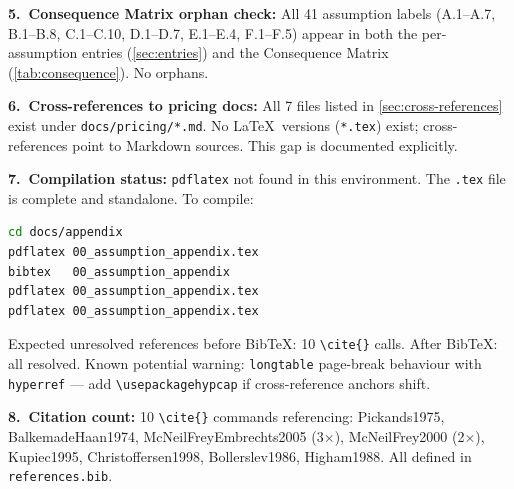 \documentclass[11pt,a4paper]{article}
\newcommand{\code}[1]{\texttt{#1}}
\begin{document}
\textbf{5.\ Consequence Matrix orphan check:} All 41 assumption labels
(A.1--A.7, B.1--B.8, C.1--C.10, D.1--D.7, E.1--E.4, F.1--F.5) appear
in both the per-assumption entries (\cref{sec:entries}) and the Consequence
Matrix (\cref{tab:consequence}). No orphans.

\textbf{6.\ Cross-references to pricing docs:} All 7 files listed in
\cref{sec:cross-references} exist under \code{docs/pricing/*.md}.
No \LaTeX\ versions (\code{*.tex}) exist; cross-references point to Markdown
sources. This gap is documented explicitly.

\textbf{7.\ Compilation status:} \code{pdflatex} not found in this environment.
The \code{.tex} file is complete and standalone. To compile:
\begin{lstlisting}[language=bash]
cd docs/appendix
pdflatex 00_assumption_appendix.tex
bibtex   00_assumption_appendix
pdflatex 00_assumption_appendix.tex
pdflatex 00_assumption_appendix.tex
\end{lstlisting}
Expected unresolved references before BibTeX: 10 \verb|\cite{}| calls.
After BibTeX: all resolved. Known potential warning: \code{longtable}
page-break behaviour with \code{hyperref} --- add \code{\textbackslash usepackage{hypcap}}
if cross-reference anchors shift.

\textbf{8.\ Citation count:} 10 \verb|\cite{}| commands referencing:
Pickands1975, BalkemadeHaan1974, McNeilFreyEmbrechts2005 (3$\times$),
McNeilFrey2000 (2$\times$), Kupiec1995, Christoffersen1998, Bollerslev1986,
Higham1988. All defined in \code{references.bib}.



\end{document}

